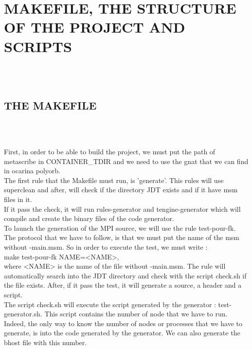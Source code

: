 \documentclass[a4paper,oneside,12pt]{article}
\begin{document}
\section{MAKEFILE, THE STRUCTURE OF THE PROJECT AND SCRIPTS}
\textbf{\\\\}

\subsection{THE MAKEFILE}
\textbf{\\\\}

   First, in order to be able to build the project, we must put the path of metascribe in CONTAINER\_TDIR and we need to use the gnat that we can find in ocarina polyorb.\\

   The first rule that the Makefile must run, is 'generate'. This rules will use superclean and after, will check if the directory JDT exists and if it have msm files in it.\\
 
   If it pass the check, it will run rules-generator and tengine-generator which will compile and create the binary files of the code generator.\\
 
  To launch the generation of the MPI source, we will use the rule test-pour-fk. The protocol that we have to follow, is that we must put the name of the msm without -main.msm. So in order to execute the test, we must write : \\

    make test-pour-fk NAME=<NAME>,\\

where <NAME> is the name of the file without -main.msm. The rule will automatically search into the JDT directory and check with the script check.sh if the file exists. After, if it pass the test, it will generate a source, a header and a script.\\

    The script check.sh will execute the script generated by the generator : test-generator.sh. This script contains the number of node that we have to run. Indeed, the only way to know the number of nodes or processes that we have to generate, is into the code generated by the generator. We can also generate the bhost file with this number.\\
\end{document}
